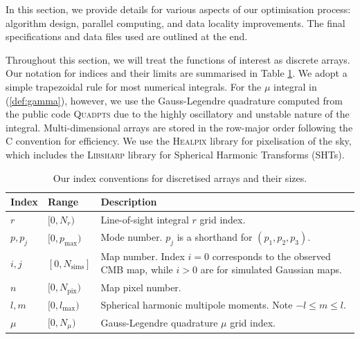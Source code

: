 In this section, we provide details for various aspects of our optimisation process: algorithm design, parallel computing, and data locality improvements. The final specifications and data files used are outlined at the end.

Throughout this section, we will treat the functions of interest as discrete arrays. Our notation for indices and their limits are summarised in Table \ref{table:index_conventions}. We adopt a simple trapezoidal rule for most numerical integrals. For the $\mu$ integral in (\ref{def:gamma}), however, we use the Gauss-Legendre quadrature computed from the public code \textsc{Quadpts} \cite{Hale2013} due to the highly oscillatory and unstable nature of the integral. Multi-dimensional arrays are stored in the row-major order following the \textsc{C} convention for efficiency. We use the \textsc{Healpix} library \cite{Gorski2005healpix} for pixelisation of the sky, which includes the \textsc{Libsharp} \cite{Reinecke2013libsharp} library for Spherical Harmonic Transforms (SHTs).

\begin{table}[htbp]
	\caption{Our index conventions for discretised arrays and their sizes.}
	\centering
	\label{table:index_conventions}
	\renewcommand{\arraystretch}{1.5} 
	\begin{tabular}{m{}  m{}  m{}} \toprule
		Index & Range & Description \\
		
		\midrule
		$r$ & $[0, N_r)$ & Line-of-sight integral $r$ grid index. \\
		
		$p, p_j$ & $[0, p_\text{max})$ & Mode number. $p_j$ is a shorthand for $(p_1, p_2, p_3)$. \\
		
		$i,j$ & $[0, N_\text{sims}]$ & Map number. Index $i=0$ corresponds to the observed CMB map, while $i>0$ are for simulated Gaussian maps. \\			
		
		$n$ & $[0, N_\text{pix})$ & Map pixel number. \\ 
		
		$l,m$ & $[0, l_\text{max})$ & Spherical harmonic multipole moments. Note $-l \le m \le l$. \\
		
		$\mu$ & $[0, N_\mu)$ & Gauss-Legendre quadrature $\mu$ grid index. \\
		
		\bottomrule
	\end{tabular}
\end{table}

